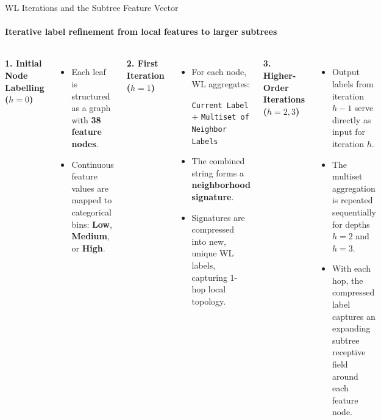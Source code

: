 \documentclass[aspectratio=169, 11pt]{beamer}
\begin{document}
\begin{frame}{WL Iterations and the Subtree Feature Vector}
    \framesubtitle{Iterative label refinement from local features to larger subtrees \cite{shervashidze2011weisfeiler}}

    \begin{columns}[T]
        \textbf{1. Initial Node Labelling ($h = 0$)}
        \vspace{0.15cm}
        \begin{itemize}\footnotesize
            \item Each leaf is structured as a graph with \textbf{38 feature nodes}.
            \item Continuous feature values are mapped to categorical bins: \textbf{Low}, \textbf{Medium}, or \textbf{High}.
        \end{itemize}

        \vspace{0.3cm}
        \textbf{2. First Iteration ($h = 1$)}
        \vspace{0.15cm}
        \begin{itemize}\footnotesize
            \item For each node, WL aggregates:
            \begin{center}
                \scriptsize\texttt{Current Label} $+$ \texttt{Multiset of Neighbor Labels}
            \end{center}
            \item The combined string forms a \textbf{neighborhood signature}.
            \item Signatures are compressed into new, unique WL labels, capturing 1-hop local topology.
        \end{itemize}

        \textbf{3. Higher-Order Iterations ($h = 2, 3$)}
        \vspace{0.15cm}
        \begin{itemize}\footnotesize
            \item Output labels from iteration $h-1$ serve directly as input for iteration $h$.
            \item The multiset aggregation is repeated sequentially for depths \textbf{$h = 2$} and \textbf{$h = 3$}.
            \item With each hop, the compressed label captures an expanding subtree receptive field around each feature node.
        \end{itemize}


\end{columns}
\end{frame}
\end{document}
